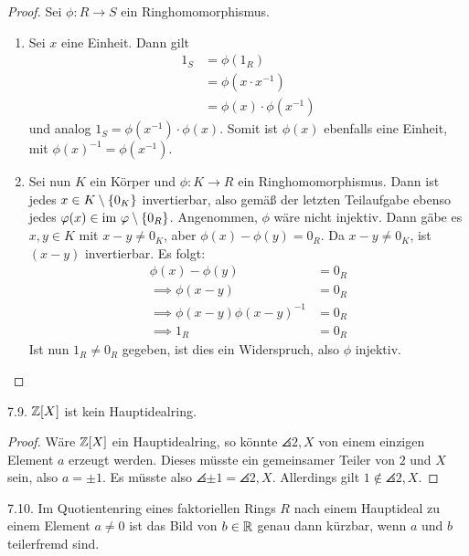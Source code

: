 \documentclass{article}
\newcommand{\ex}[1]{\tit{Übung} #1.}
\begin{document}
		\begin{proof}
			Sei $\phi : R \to S$ ein Ringhomomorphismus.
			\begin{enumerate}
				\item Sei $x$ eine Einheit. Dann gilt
				\begin{align*}
					1_S 
					&= \phi(1_R)\\
					&= \phi(x \cdot x^{-1})\\
					&= \phi(x) \cdot \phi(x^{-1})
				\end{align*}
				und analog $1_S  = \phi(x^{-1}) \cdot \phi(x)$. Somit ist $\phi(x)$ ebenfalls eine Einheit, mit $\phi(x)^{-1} = \phi(x^{-1})$.
				\item Sei nun $K$ ein Körper und $\phi : K \to R$ ein Ringhomomorphismus. Dann ist jedes $x \in K \setminus \qty{0_K}$ invertierbar, also gemäß der letzten Teilaufgabe ebenso jedes $\varphi(x) \in \textnormal{im}~ \varphi \setminus \qty{0_R}$. 
				\newpar
				Angenommen, $\phi$ wäre nicht injektiv. Dann gäbe es $x,y \in K$ mit $x - y \neq 0_K$, aber $\phi(x) - \phi(y) = 0_R$. Da $x - y \neq 0_K$, ist $(x-y)$ invertierbar. Es folgt:
				\begin{align*}
					\phi(x) - \phi(y) &= 0_R\\
					\implies \phi(x-y) &= 0_R\\
					\implies \phi(x-y)\phi(x-y)^{-1} &= 0_R\\
					\implies 1_R &= 0_R
				\end{align*}
				Ist nun $1_R \neq 0_R$ gegeben, ist dies ein Widerspruch, also $\phi$ injektiv. 
			\end{enumerate}
		\end{proof}
		\newpar
		\ex{7.9} $\mathbb{Z}[X]$ ist kein Hauptidealring.
		\begin{proof}
			Wäre $\mathbb{Z}[X]$ ein Hauptidealring, so könnte $\angles{2,X}$ von einem einzigen Element $a$ erzeugt werden. Dieses müsste ein gemeinsamer Teiler von $2$ und $X$ sein, also $a = \pm 1$. Es müsste also $\angles{\pm 1} = \angles{2,X}$. Allerdings gilt $1 \notin \angles{2,X}$.
		\end{proof}
		\newpar
		\ex{7.10} Im Quotientenring eines faktoriellen Rings $R$ nach einem Hauptideal zu einem Element $a \neq 0$ ist das Bild von $b \in \mathbb{R}$ genau dann kürzbar, wenn $a$ und $b$ teilerfremd sind.
\end{document}
